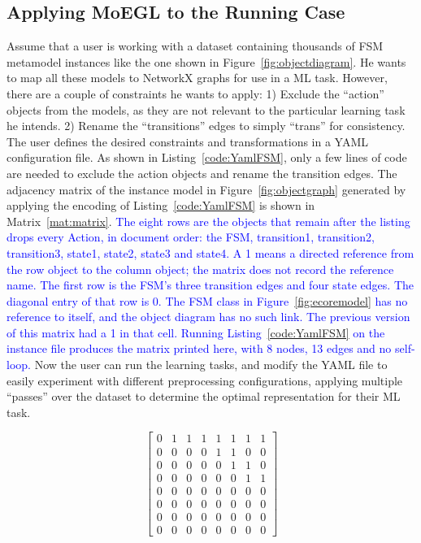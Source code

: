\documentclass[journal,article,submit,moreauthors,technologies]{Definitions/mdpi}
\newcommand{\rev}[1]{\textcolor{blue}{#1}}
\begin{document}
\subsection{Applying MoEGL to the Running Case}\label{sec:applying}
Assume that a user is working with a dataset containing thousands of FSM metamodel instances like the one shown in Figure~\ref{fig:objectdiagram}. He wants to map all these models to NetworkX graphs for use in a ML task. However, there are a couple of constraints he wants to apply: 1) Exclude the ``action'' objects from the models, as they are not relevant to the particular learning task he intends. 2) Rename the ``transitions'' edges to simply ``trans'' for consistency.
The user defines the desired constraints and transformations in a YAML configuration file. As shown in Listing~\ref{code:YamlFSM}, only a few lines of code are needed to exclude the action objects and rename the transition edges.
The adjacency matrix of the instance model in Figure~\ref{fig:objectgraph} generated by applying the encoding of Listing~\ref{code:YamlFSM} is shown in Matrix~\ref{mat:matrix}.
\rev{The eight rows are the objects that remain after the listing drops every Action, in document order: the FSM, transition1, transition2, transition3, state1, state2, state3 and state4. A 1 means a directed reference from the row object to the column object; the matrix does not record the reference name. The first row is the FSM's three transition edges and four state edges. The diagonal entry of that row is 0. The FSM class in Figure~\ref{fig:ecoremodel} has no reference to itself, and the object diagram has no such link. The previous version of this matrix had a 1 in that cell. Running Listing~\ref{code:YamlFSM} on the instance file produces the matrix printed here, with 8 nodes, 13 edges and no self-loop.}
Now the user can run the learning tasks, and modify the YAML file to easily experiment with different preprocessing configurations, applying multiple ``passes'' over the dataset to determine the optimal representation for their ML task.

\begin{mat}[H]
\begin{equation}
    \begin{bmatrix}
0 & 1 & 1 & 1 & 1 & 1 & 1 & 1 \\
0 & 0 & 0 & 0 & 1 & 1 & 0 & 0 \\
0 & 0 & 0 & 0 & 0 & 1 & 1 & 0 \\
0 & 0 & 0 & 0 & 0 & 0 & 1 & 1 \\
0 & 0 & 0 & 0 & 0 & 0 & 0 & 0 \\
0 & 0 & 0 & 0 & 0 & 0 & 0 & 0 \\
0 & 0 & 0 & 0 & 0 & 0 & 0 & 0 \\
0 & 0 & 0 & 0 & 0 & 0 & 0 & 0
    \end{bmatrix}
\end{equation}
\caption{\rev{Adjacency matrix produced by running Listing~\ref{code:YamlFSM}. The diagonal is 0: the FSM object has no edge to itself.}}
\label{mat:matrix}
\end{mat}
\end{document}

